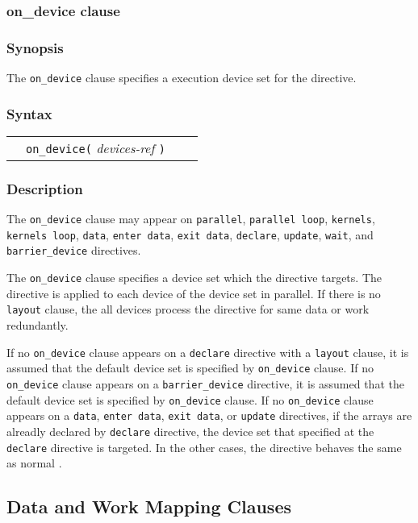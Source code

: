\subsubsection{on\_device clause}
\subsubsection*{Synopsis}
The {\tt on\_device} clause specifies a execution device set for the directive.

\subsubsection*{Syntax}
\begin{tabular}{llll}
             & \verb|on_device(| {\it devices-ref} \verb|)|\\
\end{tabular}

\subsubsection*{Description}
The {\tt on\_device} clause may appear on {\tt parallel}, {\tt parallel loop}, {\tt kernels}, {\tt kernels loop}, {\tt data}, {\tt enter data}, {\tt exit data}, {\tt declare}, {\tt update}, {\tt wait}, and {\tt barrier\_device} directives.

The {\tt on\_device} clause specifies a device set which the directive targets.
The directive is applied to each device of the device set in parallel.
If there is no {\tt layout} clause, the all devices process the directive for same data or work redundantly.

If no {\tt on\_device} clause appears on a {\tt declare} directive with a {\tt layout} clause, it is assumed that the default device set is specified by {\tt on\_device} clause.
If no {\tt on\_device} clause appears on a {\tt barrier\_device} directive, it is assumed that the default device set is specified by {\tt on\_device} clause.
If no {\tt on\_device} clause appears on a {\tt data}, {\tt enter data}, {\tt exit data}, or {\tt update} directives, if the arrays are alreadly declared by {\tt declare} directive, the device set that specified at the {\tt declare} directive is targeted.
In the other cases, the directive behaves the same as normal {\OACC}.

\subsection{Data and Work Mapping Clauses}
